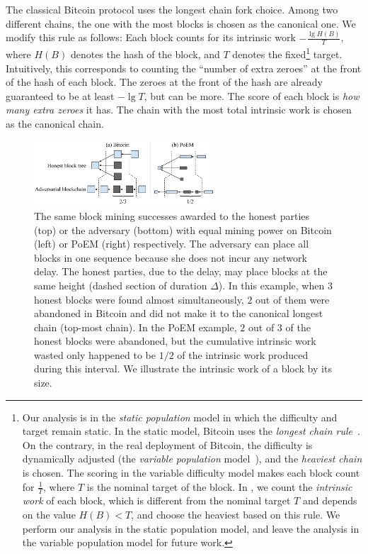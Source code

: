 \noindent
{}
The classical Bitcoin protocol uses the longest chain fork choice. Among two different
chains, the one with the most blocks is chosen as the canonical one. We modify this
rule as follows: Each block counts for its intrinsic work $-\frac{\lg H(B)}{T}$,
where $H(B)$ denotes the hash of the block, and $T$ denotes the fixed\footnote{Our
analysis is in the \emph{static population} model in which the difficulty
and target remain static. In the static model, Bitcoin uses the \emph{longest chain rule}~\cite{backbone}.
On the contrary, in the real deployment of Bitcoin, the difficulty is dynamically adjusted (the
\emph{variable population} model~\cite{varbackbone}), and the \emph{heaviest chain} is chosen.
The scoring in the variable difficulty model makes each block count for $\frac{1}{T}$, where
$T$ is the nominal target of the block. In \poem, we count the \emph{intrinsic work}
of each block, which is different from the nominal target $T$ and depends on the value $H(B) < T$,
and choose the heaviest based on this rule.
We perform our analysis in the static population model, and leave the analysis in the variable
population model for future work.} target. Intuitively, this corresponds to counting the
``number of extra zeroes'' at the front of the hash of each block. The zeroes at the front of the hash are already guaranteed
to be at least $-\lg T$, but can be more. The score of each block is \emph{how many extra zeroes}
it has. The chain with the most total intrinsic work is chosen as the canonical chain.

\begin{figure}
  \centering
  \includegraphics[width=0.6\textwidth,keepaspectratio]{figures/poem_work_wasted.pdf}
  \caption{The same block mining successes awarded to the honest parties (top) or the adversary (bottom)
           with equal mining power on Bitcoin (left) or PoEM (right) respectively. The adversary can place
           all blocks in one sequence because she does not incur any network delay. The honest parties,
           due to the delay, may place blocks at the same height (dashed section of duration $\Delta$).
           In this example, when $3$ honest blocks were found almost simultaneously, $2$ out of
           them were abandoned in Bitcoin and did not make it to the canonical longest chain
           (top-most chain).
           In the PoEM example, $2$ out of $3$ of the honest blocks were abandoned, but the cumulative intrinsic
           work wasted only happened to be $1/2$ of the intrinsic work produced during this interval.
           We illustrate the intrinsic work of a block by its size.}
  \label{fig:poem-wasted-work}
\end{figure}

